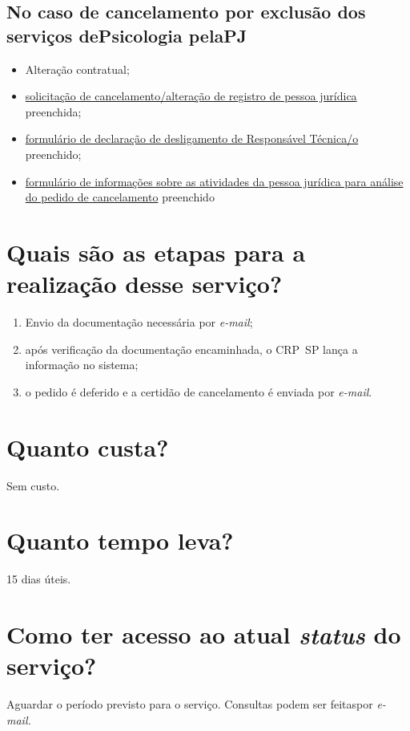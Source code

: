 \subsection{No caso de cancelamento por exclusão dos serviços dePsicologia pelaPJ}

\begin{itemize}
  \item  Alteração contratual;
  \item  \hyperref[]{solicitação  de cancelamento/alteração de registro de pessoa jurídica} preenchida;
  \item  \hyperref[]{formulário  de declaração de desligamento de Responsável Técnica/o} preenchido;
  \item  \hyperref[]{formulário  de informações sobre as atividades da pessoa jurídica para análise do  pedido de cancelamento} preenchido
\end{itemize}

\section{Quais são as etapas para a realização desse serviço?}

\begin{enumerate}
  \item  Envio da documentação necessária por \emph{e-mail};
  \item  após verificação da documentação encaminhada, o CRP~SP lança a  informação no sistema;
  \item  o pedido é deferido e a certidão de cancelamento é enviada por  \emph{e-mail}.
\end{enumerate}

\section{Quanto custa?}

Sem custo.

\section{Quanto tempo leva?}

15 dias úteis.

\section{Como ter acesso ao atual \emph{status} do serviço?}

Aguardar o período previsto para o serviço. Consultas podem ser feitaspor \emph{e-mail.}

